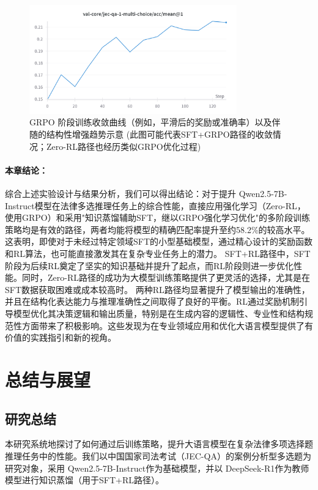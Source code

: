 \documentclass{pkuthesis}
\newcommand{\qwen}{Qwen2.5-7B-Instruct}
\newcommand{\deepseekr}{DeepSeek-R1}
\begin{document}
\begin{figure}[h]
\centering
\includegraphics[width=0.8\textwidth]{figures/GRPO_DeepSeek-R1-Distill-Qwen-7B.png} %
\caption{GRPO 阶段训练收敛曲线（例如，平滑后的奖励或准确率）以及伴随的结构性增强趋势示意 (此图可能代表SFT+GRPO路径的收敛情况；Zero-RL路径也经历类似GRPO优化过程)}
\label{fig:grpo_distill_convergence_revised} %
\end{figure}

\paragraph{本章结论：}
\label{sec:chapter5_conclusion_revised}
综合上述实验设计与结果分析，我们可以得出结论：对于提升 \qwen 模型在法律多选推理任务上的综合性能，直接应用强化学习（Zero-RL，使用GRPO）和采用"知识蒸馏辅助SFT，继以GRPO强化学习优化"的多阶段训练策略均是有效的路径，两者均能将模型的精确匹配率提升至约58.2\%的较高水平。这表明，即使对于未经过特定领域SFT的小型基础模型，通过精心设计的奖励函数和RL算法，也可能直接激发其在复杂专业任务上的潜力。
SFT+RL路径中，SFT阶段为后续RL奠定了坚实的知识基础并提升了起点，而RL阶段则进一步优化性能。同时，Zero-RL路径的成功为大模型训练策略提供了更灵活的选择，尤其是在SFT数据获取困难或成本较高时。
两种RL路径均显著提升了模型输出的准确性，并且在结构化表达能力与推理准确性之间取得了良好的平衡。RL通过奖励机制引导模型优化其决策逻辑和输出质量，特别是在生成内容的逻辑性、专业性和结构规范性方面带来了积极影响。这些发现为在专业领域应用和优化大语言模型提供了有价值的实践指引和新的视角。

\section{总结与展望}
\label{sec:conclusion_future_work_revised} %

\subsection{研究总结}
本研究系统地探讨了如何通过后训练策略，提升大语言模型在复杂法律多项选择题推理任务中的性能。我们以中国国家司法考试（JEC-QA）的案例分析型多选题为研究对象，采用 \qwen 作为基础模型，并以 \deepseekr 作为教师模型进行知识蒸馏（用于SFT+RL路径）。
\end{document}
